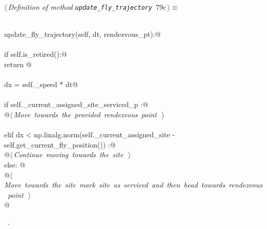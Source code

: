 \documentclass[11.5pt]{report}
\begin{document}
\begin{flushleft} \small
\begin{minipage}{\linewidth}\label{scrap121}\raggedright\small
{} $\langle\,${\itshape Definition of method \verb|update_fly_trajectory|}\nobreak\ {\footnotesize {79c}}$\,\rangle\equiv$
\vspace{-1ex}
\begin{list}{}{} \item
\mbox{}\verb@@\\
\mbox{}\verb@def update_fly_trajectory(self, dt, rendezvous_pt):@\\
\mbox{}\verb@@\\
\mbox{}\verb@     if self.is_retired():@\\
\mbox{}\verb@        return @\\
\mbox{}\verb@@\\
\mbox{}\verb@     dx = self._speed * dt@\\
\mbox{}\verb@@\\
\mbox{}\verb@     if self._current_assigned_site_serviced_p :@\\
\mbox{}\verb@        @\hbox{$\langle\,${\itshape Move towards the provided rendezvous point}\nobreak\ {\footnotesize {}}$\,\rangle$}\verb@@\\
\mbox{}\verb@@\\
\mbox{}\verb@     elif dx < np.linalg.norm(self._current_assigned_site - self.get_current_fly_position()) :@\\
\mbox{}\verb@        @\hbox{$\langle\,${\itshape Continue moving towards the site}\nobreak\ {\footnotesize {}}$\,\rangle$}\verb@@\\
\mbox{}\verb@     else: @\\
\mbox{}\verb@        @\hbox{$\langle\,${\itshape Move towards the site mark site as serviced and then head towards rendezvous point}\nobreak\ {\footnotesize {}}$\,\rangle$}\verb@@\\
\mbox{}\verb@ @{\NWsep}
\end{list}
\vspace{-1.5ex}
\footnotesize
\begin{list}{}{\setlength{\itemsep}{-\parsep}\setlength{\itemindent}{-\leftmargin}}
\item \NWtxtMacroRefIn\ .

\item{}
\end{list}
\end{minipage}\vspace{4ex}
\end{flushleft}
\end{document}
